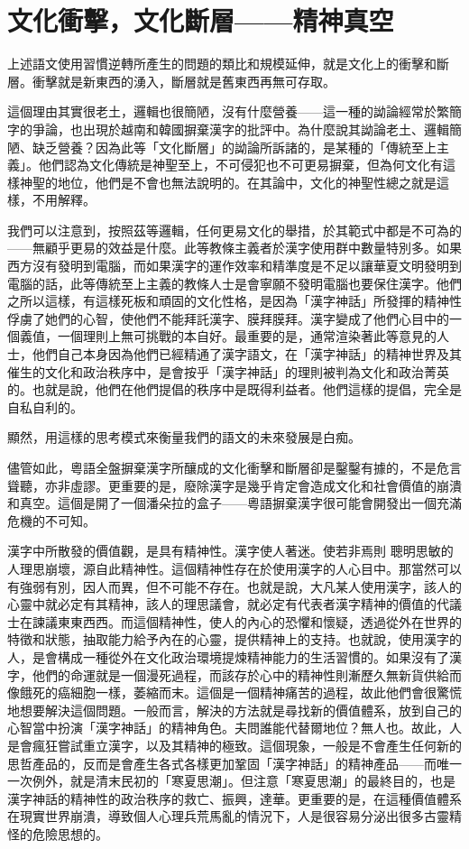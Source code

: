 \documentclass[a5paper, 12pt, openany]{book} %
\begin{document}
\section{文化衝擊，文化斷層——精神真空}

上述語文使用習慣逆轉所產生的問題的類比和規模延伸，就是文化上的衝擊和斷層。衝擊就是新東西的湧入，斷層就是舊東西再無可存取。

這個理由其實很老土，邏輯也很簡陋，沒有什麼營養——這一種的詏論經常於繁簡字的爭論，也出現於越南和韓國摒棄漢字的批評中。為什麼說其詏論老土、邏輯簡陋、缺乏營養？因為此等「文化斷層」的詏論所訴諸的，是某種的「傳統至上主義」。他們認為文化傳統是神聖至上，不可侵犯也不可更易摒棄，但為何文化有這樣神聖的地位，他們是不會也無法說明的。在其論中，文化的神聖性總之就是這樣，不用解釋。

我們可以注意到，按照茲等邏輯，任何更易文化的舉措，於其範式中都是不可為的——無顧乎更易的效益是什麼。此等教條主義者於漢字使用群中數量特別多。如果西方沒有發明到電腦，而如果漢字的運作效率和精準度是不足以讓華夏文明發明到電腦的話，此等傳統至上主義的教條人士是會寧願不發明電腦也要保住漢字。他們之所以這樣，有這樣死板和頑固的文化性格，是因為「漢字神話」所發揮的精神性俘虜了她們的心智，使他們不能拜託漢字、膜拜膜拜。漢字變成了他們心目中的一個義值，一個理則上無可挑戰的本自好。最重要的是，通常渲染著此等意見的人士，他們自己本身因為他們已經精通了漢字語文，在「漢字神話」的精神世界及其催生的文化和政治秩序中，是會按乎「漢字神話」的理則被判為文化和政治菁英的。也就是說，他們在他們提倡的秩序中是既得利益者。他們這樣的提倡，完全是自私自利的。

顯然，用這樣的思考模式來衡量我們的語文的未來發展是白痴。

儘管如此，粵語全盤摒棄漢字所釀成的文化衝擊和斷層卻是鑿鑿有據的，不是危言聳聽，亦非虛謬。更重要的是，廢除漢字是幾乎肯定會造成文化和社會價值的崩潰和真空。這個是開了一個潘朵拉的盒子——粵語摒棄漢字很可能會開發出一個充滿危機的不可知。

漢字中所散發的價值觀，是具有精神性。漢字使人著迷。使若非焉則 聰明思敏的人理思崩壞，源自此精神性。這個精神性存在於使用漢字的人心目中。那當然可以有強弱有別，因人而異，但不可能不存在。也就是說，大凡某人使用漢字，該人的心靈中就必定有其精神，該人的理思議會，就必定有代表者漢字精神的價值的代議士在諫議東東西西。而這個精神性，使人的內心的恐懼和懷疑，透過從外在世界的特徵和狀態，抽取能力給予內在的心靈，提供精神上的支持。也就說，使用漢字的人，是會構成一種從外在文化政治環境提煉精神能力的生活習慣的。如果沒有了漢字，他們的命運就是一個漫死過程，而該存於心中的精神性則漸歷久無新貨供給而像餓死的癌細胞一樣，萎縮而末。這個是一個精神痛苦的過程，故此他們會很驚慌地想要解決這個問題。一般而言，解決的方法就是尋找新的價值體系，放到自己的心智當中扮演「漢字神話」的精神角色。夫問誰能代替爾地位？無人也。故此，人是會瘋狂嘗試重立漢字，以及其精神的極致。這個現象，一般是不會產生任何新的思哲產品的，反而是會產生各式各樣更加鞏固「漢字神話」的精神產品——而唯一一次例外，就是清末民初的「寒夏思潮」。但注意「寒夏思潮」的最終目的，也是漢字神話的精神性的政治秩序的救亡、振興，達華。更重要的是，在這種價值體系在現實世界崩潰，導致個人心理兵荒馬亂的情況下，人是很容易分泌出很多古靈精怪的危險思想的。
\end{document}
